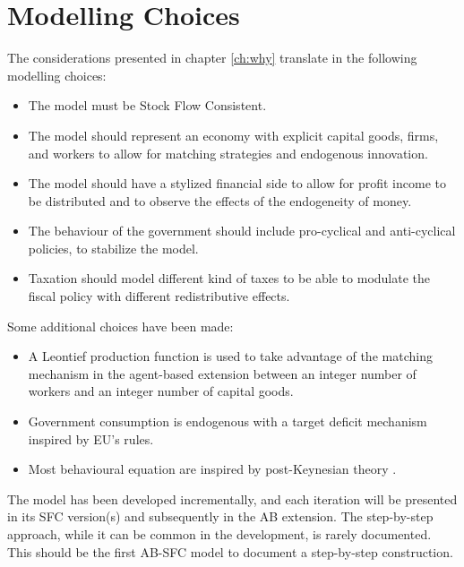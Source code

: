 \chapter{Modelling Choices}
\label{ch:choices}
The considerations presented in chapter \ref{ch:why} translate in the following modelling choices:

\begin{itemize}
    \item The model must be Stock Flow Consistent.
    \item The model should represent an economy with explicit capital goods, firms, and workers to allow for matching strategies and endogenous innovation.
    \item The model should have a stylized financial side to allow for profit income to be distributed and to observe the effects of the endogeneity of money.
    \item The behaviour of the government should include pro-cyclical and anti-cyclical policies, to stabilize the model.
    \item Taxation should model different kind of taxes to be able to modulate the fiscal policy with different redistributive effects.
\end{itemize}

Some additional choices have been made:
\begin{itemize}
    \item A Leontief production function is used to take advantage of the matching mechanism in the agent-based extension between an integer number of workers and an integer number of capital goods.
    \item Government consumption is endogenous with a target deficit mechanism inspired by EU's rules.
    \item Most behavioural equation are inspired by post-Keynesian theory \parencite{lavoie2022}.
\end{itemize}

The model has been developed incrementally, and each iteration will be presented in its SFC version(s) and subsequently in the AB extension.
The step-by-step approach, while it can be common in the development, is rarely documented. This should be the first AB-SFC model to document a step-by-step construction.